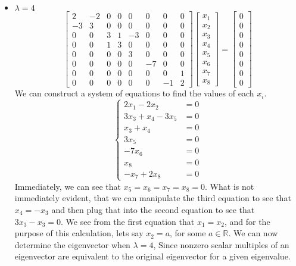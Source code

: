 \documentclass{report}
\begin{document}
\begin{itemize}
\item $\lambda = 4$
$$
\begin{bmatrix}
2&-2&0&0&0&0&0&0\\
-3&3&0&0&0&0&0&0\\
0&0&3&1&-3&0&0&0\\
0&0&1&3&0&0&0&0\\
0&0&0&0&3&0&0&0\\
0&0&0&0&0&-7&0&0\\
0&0&0&0&0&0&0&1\\
0&0&0&0&0&0&-1&2
\end{bmatrix}
\begin{bmatrix}
x_1 \\ x_2 \\ x_3 \\ x_4 \\ x_5 \\ x_6 \\ x_7 \\ x_8
\end{bmatrix} = \begin{bmatrix}
0 \\ 0 \\ 0 \\ 0 \\ 0 \\ 0 \\ 0 \\ 0
\end{bmatrix}
$$
We can construct a system of equations to find the values of each $x_i$.
$$
\left\{
\begin{aligned}
2x_1 - 2x_2 & = 0 \\
3x_3+x_4-3x_5 & = 0 \\
x_3 + x_4 & = 0 \\
3x_5 & = 0 \\
-7x_6 & = 0 \\
x_8 & = 0 \\
-x_7 + 2x_8 & = 0
\end{aligned}
\right.
$$
Immediately,  we can see that $x_5=x_6=x_7=x_8=0$.  What is not immediately evident,  that we can manipulate the third equation to see that $x_4 = -x_3$ and then plug that into the second equation to see that $3x_3 - x_3 = 0$.  We see from the first equation that $x_1 = x_2$,  and for the purpose of this calculation,  lets say $x_2 = a$,  for some $a\in\mathbb{R}$.  We can now determine the eigenvector when $\lambda = 4$,  Since nonzero scalar multiples of an eigenvector are equivalent to the original eigenvector for a given eigenvalue. 

\end{itemize}
\end{document}
